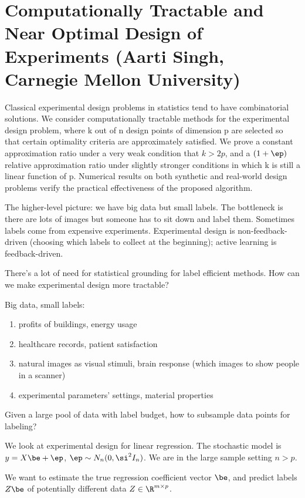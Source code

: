\section{Computationally Tractable and Near Optimal Design of Experiments (Aarti Singh, Carnegie Mellon University)}

Classical experimental design problems in statistics tend to have combinatorial solutions. We consider computationally tractable methods for the experimental design problem, where k out of n design points of dimension p are selected so that certain optimality criteria are approximately satisfied. We prove a constant approximation ratio under a very weak condition that $k > 2p$, and a $(1 + \ep)$ relative approximation ratio under
slightly stronger conditions in which k is still a linear function of p. Numerical results on both synthetic and real-world design problems verify the practical effectiveness of the proposed algorithm.

The higher-level picture: we have big data but small labels. The bottleneck is there are lots of images but someone has to sit down and label them. Sometimes labels come from expensive experiments. Experimental design is non-feedback-driven (choosing which labels to collect at the beginning); active learning is feedback-driven. %

There's a lot of need for statistical grounding for label efficient methods. 
How can we make experimental design more tractable? 

Big data, small labels:
\begin{enumerate}
\item
profits of buildings, energy usage
\item
healthcare records, patient satisfaction
\item
natural images as visual stimuli, brain response (which images to show people in a scanner)
\item
experimental parameters' settings, material properties
\end{enumerate}

Given a large pool of data with label budget, how to subsample data points for labeling?

We look at experimental design for linear regression. The stochastic model is $y=X\be + \ep$, $\ep\sim N_n(0,\si^2I_n)$. We are in the large sample setting $n>p$. 

We want to estimate the true regression coefficient vector $\be$, and predict labels $Z\be$ of potentially different data $Z\in \R^{m\times p}$. 


